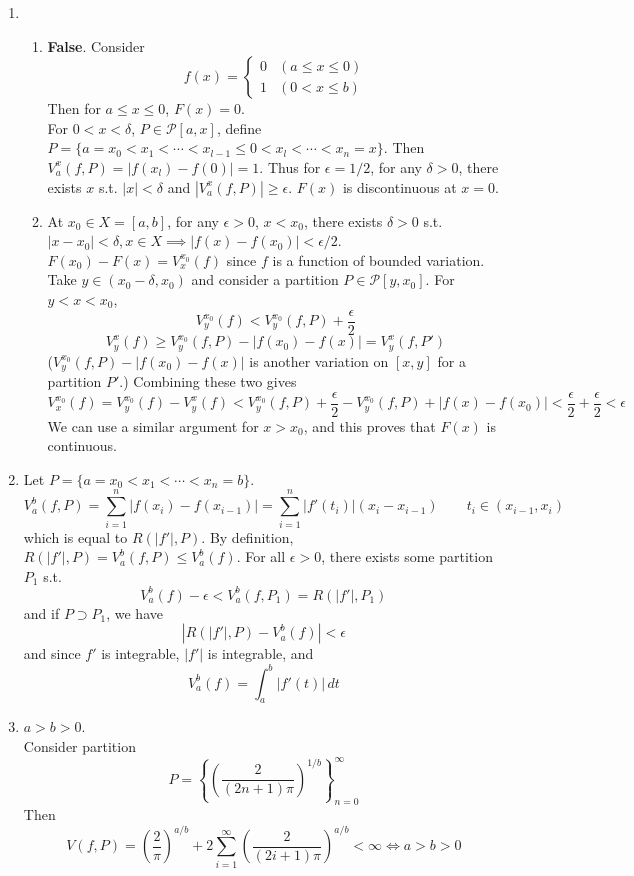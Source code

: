 \documentclass[11pt]{report}
\newcommand{\mc}[1]{\mathcal{#1}}
\newcommand{\abs}[1]{\left|#1\right|}
\newcommand{\imp}{\implies}
\begin{document}
\begin{enumerate}
\item 
\begin{enumerate}
	\item \textbf{False}. Consider $$f(x) = \begin{cases}
	 	0 & (a \leq x \leq 0) \\ 1 & (0 < x \leq b)
	\end{cases}$$
	Then for $a\leq x\leq 0$, $F(x) = 0$.\\
	For $0 < x < \delta$, $P\in \mc{P}[a, x]$, define $P = \{a = x_0 < x_1 < \cdots < x_{l-1} \leq 0 < x_l < \cdots < x_n =x\}$. Then $V_a^x(f, P) = \abs{f(x_l)-f(0)} = 1$. Thus for $\epsilon = 1/2$, for any $\delta > 0$, there exists $x$ s.t. $\abs{x} < \delta$ and $ \abs{V_a^x(f, P)} \geq \epsilon $. $F(x)$ is discontinuous at $x = 0$.
	\item At $x_0 \in X = [a, b]$, for any $\epsilon > 0$, $x < x_0$, there exists $\delta >0$ s.t. $\abs{x-x_0} < \delta, x\in X \imp \abs{f(x) - f(x_0)} < \epsilon/2$.
	$F(x_0)-F(x) = V_x^{x_0}(f)$ since $f$ is a function of bounded variation. Take $y \in (x_0-\delta, x_0)$ and consider a partition $P\in\mc{P}[y, x_0]$. For $y < x < x_0$,
	$$V_y^{x_0}(f) < V_y^{x_0}(f, P) + \frac{\epsilon}{2}$$
	$$V_y^x(f) \geq V_y^{x_0}(f, P) - \abs{f(x_0) - f(x)} = V_y^x(f, P')$$
	($V_y^{x_0}(f, P) - \abs{f(x_0) - f(x)}$ is another variation on $[x, y]$ for a partition $P'$.) Combining these two gives
	$$V_x^{x_0}(f) = V_y^{x_0}(f) - V_y^x(f) < V_y^{x_0}(f, P) + \frac{\epsilon}{2} - V_y^{x_0}(f, P) + \abs{f(x)-f(x_0)} < \frac{\epsilon}{2}+\frac{\epsilon}{2} < \epsilon$$
	We can use a similar argument for $x > x_0$, and this proves that $F(x)$ is continuous.
\end{enumerate}

\item Let $P = \{a = x_0 < x_1 < \cdots  < x_n = b\}$.
$$V_a^b(f, P) = \sum_{i=1}^n \abs{f(x_i)-f(x_{i-1})} = \sum_{i=1}^n \abs{f'(t_i)}(x_i-x_{i-1}) \qquad t_i\in (x_{i-1}, x_i)$$
which is equal to $R(\abs{f'}, P)$. By definition, $R(\abs{f'}, P) = V_a^b(f, P) \leq V_a^b(f)$.
For all $\epsilon>0$, there exists some partition $P_1$ s.t.
$$V_a^b(f)-\epsilon < V_a^b(f, P_1) = R(\abs{f'}, P_1)$$
and if $P\supset P_1$, we have $$\abs{R(\abs{f'}, P) - V_a^b(f)} < \epsilon$$ and since $f'$ is integrable, $\abs{f'}$ is integrable, and $$V_a^b(f) = \int_a^b \abs{f'(t)}\,dt$$

\item $a > b > 0$.\\
Consider partition $$P = \left\{ \left(\frac{2}{(2n+1)\pi}\right)^{1/b} \right\}_{n=0}^\infty$$
Then $$V(f, P) = \left(\frac{2}{\pi}\right)^{a/b} + 2 \sum_{i=1}^\infty \left(\frac{2}{(2i+1)\pi}\right)^{a/b} < \infty \iff a > b > 0$$


\end{enumerate}
\end{document}
